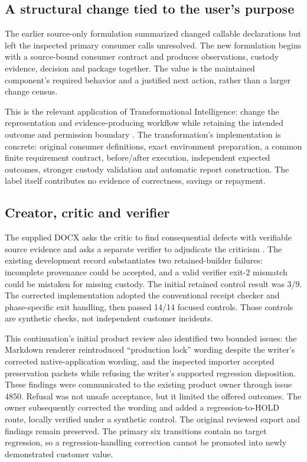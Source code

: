 \documentclass[11pt,letterpaper]{article}
\begin{document}
\subsection{A structural change tied to the user's purpose}
The earlier source-only formulation summarized changed callable declarations but left the inspected primary consumer calls unresolved. The new formulation begins with a source-bound consumer contract and produces observations, custody evidence, decision and package together. The value is the maintained component's required behavior and a justified next action, rather than a larger change census.

This is the relevant application of Transformational Intelligence: change the representation and evidence-producing workflow while retaining the intended outcome and permission boundary \cite{ti}. The transformation's implementation is concrete: original consumer definitions, exact environment preparation, a common finite requirement contract, before/after execution, independent expected outcomes, stronger custody validation and automatic report construction. The label itself contributes no evidence of correctness, savings or repayment.

\subsection{Creator, critic and verifier}
The supplied DOCX asks the critic to find consequential defects with verifiable source evidence and asks a separate verifier to adjudicate the criticism \cite{docx}. The existing development record substantiates two retained-builder failures: incomplete provenance could be accepted, and a valid verifier exit-2 mismatch could be mistaken for missing custody. The initial retained control result was 3/9. The corrected implementation adopted the conventional receipt checker and phase-specific exit handling, then passed 14/14 focused controls. Those controls are synthetic checks, not independent customer incidents.

This continuation's initial product review also identified two bounded issues: the Markdown renderer reintroduced ``production lock'' wording despite the writer's corrected native-application wording, and the inspected importer accepted preservation packets while refusing the writer's supported regression disposition. These findings were communicated to the existing product owner through issue 4850. Refusal was not unsafe acceptance, but it limited the offered outcomes. The owner subsequently corrected the wording and added a regression-to-HOLD route, locally verified under a synthetic control. The original reviewed export and findings remain preserved. The primary six transitions contain no target regression, so a regression-handling correction cannot be promoted into newly demonstrated customer value.
\end{document}
